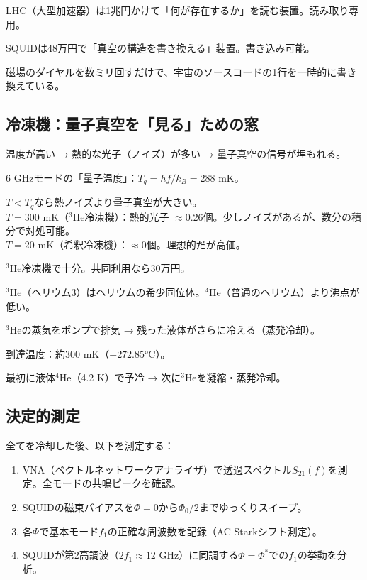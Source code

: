 \documentclass[12pt,a4paper]{article}
\begin{document}
\begin{storybox}[SQUIDの本質]
LHC（大型加速器）は1兆円かけて「何が存在するか」を読む装置。読み取り専用。

SQUIDは48万円で「真空の構造を書き換える」装置。書き込み可能。

磁場のダイヤルを数ミリ回すだけで、宇宙のソースコードの1行を一時的に書き換えている。
\end{storybox}

\subsection{冷凍機：量子真空を「見る」ための窓}

\begin{physbox}[なぜ冷やす必要があるか]
温度が高い → 熱的な光子（ノイズ）が多い → 量子真空の信号が埋もれる。

6 GHzモードの「量子温度」：$T_q = h f / k_B = 288$ mK。

$T < T_q$なら熱ノイズより量子真空が大きい。\\
$T = 300$ mK（$^3$He冷凍機）：熱的光子 $\approx 0.26$個。少しノイズがあるが、数分の積分で対処可能。\\
$T = 20$ mK（希釈冷凍機）：$\approx 0$個。理想的だが高価。

$^3$He冷凍機で十分。共同利用なら30万円。
\end{physbox}

\begin{physbox}
$^3$He（ヘリウム3）はヘリウムの希少同位体。$^4$He（普通のヘリウム）より沸点が低い。

$^3$Heの蒸気をポンプで排気 → 残った液体がさらに冷える（蒸発冷却）。

到達温度：約300 mK（$-272.85$°C）。

最初に液体$^4$He（4.2 K）で予冷 → 次に$^3$Heを凝縮・蒸発冷却。
\end{physbox}

\subsection{決定的測定}

全てを冷却した後、以下を測定する：

\begin{enumerate}
\item VNA（ベクトルネットワークアナライザ）で透過スペクトル$S_{21}(f)$を測定。全モードの共鳴ピークを確認。
\item SQUIDの磁束バイアスを$\Phi = 0$から$\Phi_0/2$までゆっくりスイープ。
\item 各$\Phi$で基本モード$f_1$の正確な周波数を記録（AC Starkシフト測定）。
\item SQUIDが第2高調波（$2f_1 \approx 12$ GHz）に同調する$\Phi = \Phi^*$での$f_1$の挙動を分析。
\end{enumerate}
\end{document}
